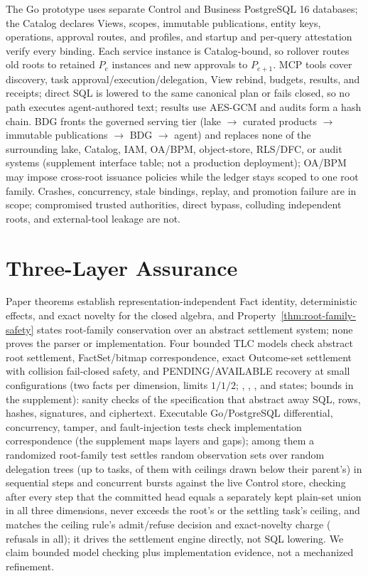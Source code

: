 \documentclass[10pt,journal,compsoc]{IEEEtran}
\begin{document}
The Go prototype uses separate Control and Business PostgreSQL 16 databases;
the Catalog declares Views, scopes, immutable publications, entity keys,
operations, approval routes, and profiles, and startup and per-query
attestation verify every binding. Each service instance is Catalog-bound,
so rollover routes old roots to retained $P_e$ instances and new approvals
to $P_{e+1}$. MCP tools cover discovery, task approval/execution/delegation,
View rebind, budgets, results, and receipts; direct SQL is lowered to the
same canonical plan or fails closed, so no path executes agent-authored
text; results use AES-GCM and audits form a hash chain. BDG fronts the
governed serving tier (lake $\rightarrow$ curated products $\rightarrow$
immutable publications $\rightarrow$ BDG $\rightarrow$ agent) and replaces
none of the surrounding lake, Catalog, IAM, OA/BPM, object-store, RLS/DFC,
or audit systems (supplement interface table; not a production deployment);
OA/BPM may impose cross-root issuance policies while the ledger stays
scoped to one root family. Crashes, concurrency, stale
bindings, replay, and promotion failure are in scope; compromised trusted
authorities, direct bypass, colluding independent roots, and external-tool
leakage are not.

\section{Three-Layer Assurance}
\label{sec:formal}

Paper theorems establish representation-independent Fact identity,
deterministic effects, and exact novelty for the closed algebra, and
Property~\ref{thm:root-family-safety} states root-family conservation over an
abstract settlement system; none proves the parser or implementation. Four
bounded TLC models \cite{lamport2002specifying} check abstract root
settlement, FactSet/bitmap correspondence, exact Outcome-set settlement with
collision fail-closed safety, and PENDING/AVAILABLE recovery at small
configurations (two facts per dimension, limits $1/1/2$;
\ExposureFormalStates{}, \BitmapFormalStates{}, \OutcomeFormalStates{},
and \ArtifactFormalStates{} states; bounds in the supplement): sanity
checks of the specification that abstract away SQL, rows, hashes,
signatures, and ciphertext. Executable Go/PostgreSQL differential, concurrency, tamper, and
fault-injection tests check implementation correspondence (the supplement
maps layers and gaps); among them a randomized root-family test settles
\VFiveFamilyPropertyQueries{} random observation sets over
\VFiveFamilyPropertySeeds{} random delegation trees (up to
\VFiveFamilyPropertyMaxTasks{} tasks, \VFiveFamilyPropertyNarrowedTasks{}
of them with ceilings drawn below their parent's) in sequential steps and
concurrent bursts against the live Control store, checking after every
step that the committed head equals a separately kept plain-set union in
all three dimensions, never exceeds the root's or the settling task's
ceiling, and matches the ceiling rule's admit/refuse decision and
exact-novelty charge (\VFiveFamilyPropertyRefused{} refusals in all); it
drives the settlement engine directly, not SQL lowering. We claim bounded
model checking plus implementation evidence, not a mechanized refinement.
\end{document}
